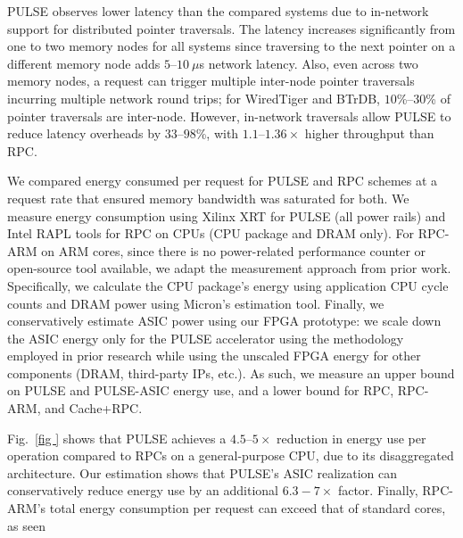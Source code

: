 PULSE observes lower latency than the compared systems due to in-network support for distributed pointer traversals. The latency increases significantly from one to two memory nodes for all systems since traversing to the next pointer on a different memory node adds $5$--$10~\mu$s network latency. Also, even across two memory nodes, a request can trigger multiple inter-node pointer traversals incurring multiple network round trips; for WiredTiger and BTrDB, $10$\%--$30$\% of pointer traversals are inter-node. However, in-network traversals allow PULSE to reduce latency overheads by $33$--$98$\%, with $1.1$--$1.36\times$ higher throughput than RPC.

 We compared energy consumed per request for PULSE and RPC schemes at a request rate that ensured memory bandwidth was saturated for both. We measure energy consumption using Xilinx XRT for PULSE (all power rails) and Intel RAPL tools for RPC on CPUs (CPU package and DRAM only). For RPC-ARM on ARM cores, since there is no power-related performance counter or open-source tool available, we adapt the measurement approach from prior work. Specifically, we calculate the CPU package's energy using application CPU cycle counts and DRAM power using Micron's estimation tool. Finally, we conservatively estimate ASIC power using our FPGA prototype: we scale down the ASIC energy only for the PULSE accelerator using the methodology employed in prior research while using the unscaled FPGA energy for other components (DRAM, third-party IPs, etc.). As such, we measure an upper bound on PULSE and PULSE-ASIC energy use, and a lower bound for RPC, RPC-ARM, and Cache+RPC.

Fig.~\ref{fig
} shows that PULSE achieves a $4.5$--$5\times$ reduction in energy use per operation compared to RPCs on a general-purpose CPU, due to its disaggregated architecture. Our estimation shows that PULSE's ASIC realization can conservatively reduce energy use by an additional $6.3-7\times$ factor. Finally, RPC-ARM's total energy consumption per request can exceed that of standard cores, as seen


